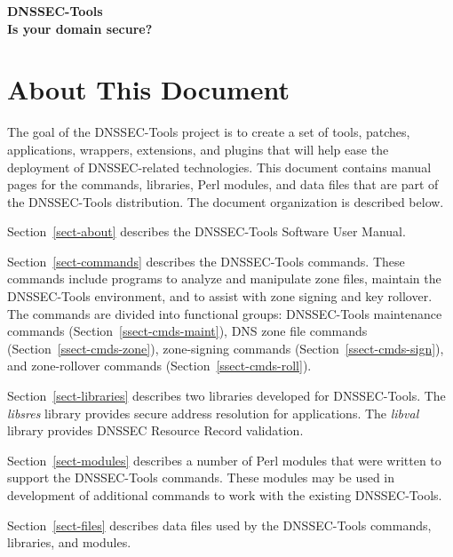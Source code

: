 \documentclass[12pt]{article}
\newcommand{\lib}[1]{{\em #1}}
\begin{document}
\clearpage

\begin{center}
{\Large
{\bf DNSSEC-Tools\\
Is your domain secure?}}
\end{center}
\tableofcontents
{}


\clearpage

\section{About This Document}
\label{sect-about}

The goal of the DNSSEC-Tools project is to create a set of tools, patches,
applications, wrappers, extensions, and plugins that will help ease the
deployment of DNSSEC-related technologies. This document contains manual pages
for the commands, libraries, Perl modules, and data files that are part of the
DNSSEC-Tools distribution.  The document organization is described below.

\begin{description}

\item
Section~\ref{sect-about} describes the DNSSEC-Tools Software User Manual.

\item
Section~\ref{sect-commands} describes the DNSSEC-Tools commands.  These
commands include programs to analyze and manipulate zone files, maintain the
DNSSEC-Tools environment, and to assist with zone signing and key rollover.
The commands are divided into functional groups:
DNSSEC-Tools maintenance commands (Section~\ref{ssect-cmds-maint}),
DNS zone file commands (Section~\ref{ssect-cmds-zone}),
zone-signing commands (Section~\ref{ssect-cmds-sign}), and
zone-rollover commands (Section~\ref{ssect-cmds-roll}).

\item
Section~\ref{sect-libraries} describes two libraries developed for
DNSSEC-Tools.  The \lib{libsres} library provides secure address resolution
for applications.  The \lib{libval} library provides DNSSEC Resource Record
validation.

\item
Section~\ref{sect-modules} describes a number of Perl modules that were
written to support the DNSSEC-Tools commands.  These modules may be used in
development of additional commands to work with the existing DNSSEC-Tools.

\item
Section~\ref{sect-files} describes data files used by the DNSSEC-Tools
commands, libraries, and modules.

\end{description}
\end{document}
